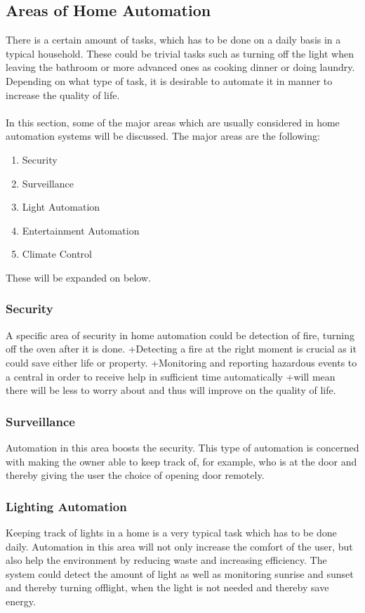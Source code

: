 \subsection{Areas of Home Automation}
\label{sec:Areas of Home Automation}
There is a certain amount of tasks, which has to be done on a daily basis in a typical household. These could be trivial tasks such as turning off the light when leaving the bathroom or more advanced ones as cooking dinner or doing laundry. Depending on what type of task, it is desirable to automate it in manner to increase the quality of life.
\\\\
In this section, some of the major areas which are usually considered in home automation systems will be discussed.
The major areas are the following:
\begin{enumerate}
  \item Security
  \item Surveillance
  \item Light Automation
  \item Entertainment Automation
  \item Climate Control
\end{enumerate}
These will be expanded on below.

\subsubsection{Security}
\label{sub:Security}
A specific area of security in home automation could be detection of fire, turning off the oven after it is done.
+Detecting a fire at the right moment is crucial as it could save either life or property.
+Monitoring and reporting hazardous events to a central in order to receive help in sufficient time automatically
+will mean there will be less to worry about and thus will improve on the quality of life.

\subsubsection{Surveillance}
\label{sub:Surveillance}
Automation in this area boosts the security.
This type of automation is concerned with making the owner able to keep track of, for example, who is at the door and
thereby giving the user the choice of opening door remotely.

\subsubsection{Lighting Automation}
\label{sub:Lighting Automation}
Keeping track of lights in a home is a very typical task which has to be done daily. Automation in this area will not only increase the comfort of the user, but also help the environment by reducing waste and increasing efficiency. The system could detect the amount of light as well as monitoring sunrise and sunset and thereby turning offlight, when the light is not needed and thereby save energy.


